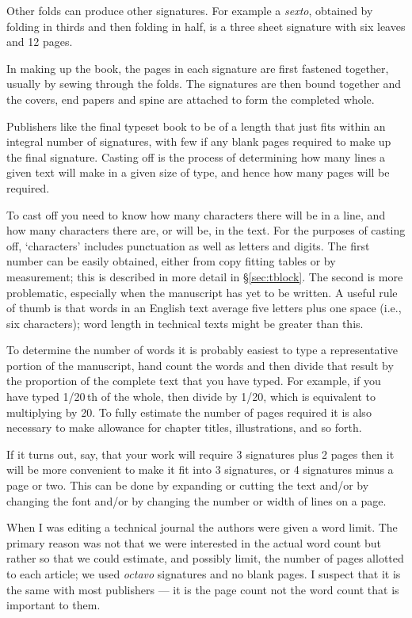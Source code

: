 \documentclass[10pt,letterpaper]{memoir}
\begin{document}
    Other folds can produce other signatures. For example a 
\emph{sexto},
obtained by folding in thirds and then folding in half, is a three sheet
signature with six leaves and 12 pages.

    In making up the book, the pages in each signature are first fastened
together, usually by sewing through the folds. The signatures are then bound
together and the covers, end papers and spine are attached to form
the completed whole.


    Publishers like the final typeset book to be of a length that just fits
within an integral number of signatures, 
with few if any blank pages required
to make up the final signature. Casting off is the
process of determining how many lines a given text will make in a given
size of type, and hence how many pages will be required.

    To cast off you need to know how many characters there will be in
a line, and how many characters there are, or will be, in the text. 
For the purposes of casting off, `characters' includes punctuation as well
as letters and digits. The
first number can be easily obtained, either from copy fitting tables or
by measurement; this is described in more detail in \S\ref{sec:tblock}.
The second is more problematic, especially when the manuscript has yet
to be written. A useful rule of thumb is that words in an English text
average five letters plus one space (i.e., six characters); 
word length in technical texts might be greater than this.

    To determine the number of words it is probably easiest to type a
representative portion of the manuscript, hand count the words and then
divide that result by the proportion of the complete text that you have
typed. For example, if you have typed 1/20\,th of the whole, then divide
by 1/20, which is equivalent to multiplying by 20. To fully estimate
the number of pages required it is also necessary to make allowance for
chapter titles, illustrations, and so forth.

    If it turns out, say, that your work will require 3 signatures plus 2
pages then it will be more convenient to make it fit into 3 signatures,
or 4 signatures minus a page or two. This can be done by expanding or cutting
the text and/or by changing the font 
and/or by changing the number or width
of lines on a page.

    When I was editing a technical journal the authors were given a word 
limit. The primary reason was not that we were interested in the actual
word count but rather so that we could estimate, and possibly limit, 
the number of pages allotted
to each article; we used \emph{octavo} 
signatures and no blank pages. 
I suspect that it is
the same with most publishers --- it is the page count not the word count
that is important to them.
\end{document}
